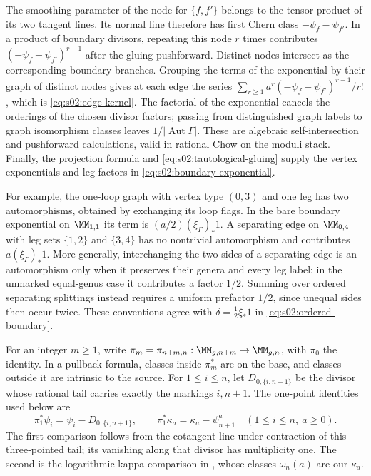 \begin{prf}
The smoothing parameter of the node for $\{f,f'\}$ belongs to the
tensor product of its two tangent lines.  Its normal line therefore
has first Chern class $-\psi_f-\psi_{f'}$.  In a product of boundary
divisors, repeating this node $r$ times contributes
$(-\psi_f-\psi_{f'})^{r-1}$ after the gluing pushforward.
Distinct nodes intersect as the corresponding boundary branches.
Grouping the terms of the exponential by their graph of distinct
nodes gives at each edge the series
$\sum_{r\geq1}a^r(-\psi_f-\psi_{f'})^{r-1}/r!$, which is
\eqref{eq:s02:edge-kernel}.  The factorial of the exponential cancels
the orderings of the chosen divisor factors; passing from distinguished
graph labels to graph isomorphism classes leaves
$1/|\operatorname{Aut}\Gamma|$.
These are algebraic self-intersection and pushforward calculations,
valid in rational Chow on the moduli stack.  Finally, the projection
formula and \eqref{eq:s02:tautological-gluing} supply the vertex
exponentials and leg factors in \eqref{eq:s02:boundary-exponential}.
\end{prf}

For example, the one-loop graph with vertex type $(0,3)$ and one leg
has two automorphisms, obtained by exchanging its loop flags.  In the
bare boundary exponential on $\MM_{1,1}$ its term is
$(a/2)(\xi_\Gamma)_*1$.  A separating edge on $\MM_{0,4}$ with leg
sets $\{1,2\}$ and $\{3,4\}$ has no nontrivial automorphism and
contributes $a(\xi_\Gamma)_*1$.  More generally, interchanging the
two sides of a separating edge is an automorphism only when it
preserves their genera and every leg label; in the unmarked equal-genus
case it contributes a factor $1/2$.  Summing over ordered separating
splittings instead requires a uniform prefactor $1/2$, since unequal
sides then occur twice.  These conventions agree with
$\delta=\frac12\xi_*1$ in \eqref{eq:s02:ordered-boundary}.

For an integer $m\geq1$, write
$\pi_m=\pi_{n+m,n}:\MM_{g,n+m}\to\MM_{g,n}$, with
$\pi_0$ the identity.  In a pullback formula, classes inside
$\pi_m^*$ are on the base, and classes outside it are intrinsic to
the source.  For $1\leq i\leq n$, let
$D_{0,\{i,n+1\}}$ be the divisor whose rational tail carries exactly
the markings $i,n+1$.  The one-point identities used below are
\begin{equation}
\label{eq:s02:one-point-comparison}
\pi_1^*\psi_i=\psi_i-D_{0,\{i,n+1\}},\qquad
\pi_1^*\kappa_a=\kappa_a-\psi_{n+1}^a
\quad(1\leq i\leq n,\ a\geq0).
\end{equation}
The first comparison follows from the
cotangent line under contraction of this three-pointed tail; its
vanishing along that divisor has multiplicity one.  The second is the
logarithmic-kappa comparison in \cite[(2.10)]{KMZ96}, whose classes
$\omega_n(a)$ are our $\kappa_a$.

